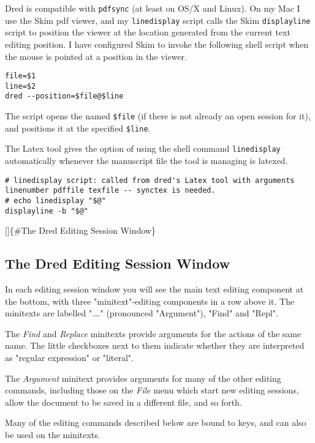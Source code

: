 \documentclass[
]{article}
\begin{document}
Dred is compatible with \texttt{pdfsync} (at least on OS/X and Linux).
On my Mac I use the Skim pdf viewer, and my \texttt{linedisplay} script
calls the Skim \texttt{displayline} script to position the viewer at the
location generated from the current text editing position. I have
configured Skim to invoke the following shell script when the mouse is
pointed at a position in the viewer.

\begin{verbatim}
file=$1
line=$2
dred --position=$file@$line
\end{verbatim}

The script opens the named \texttt{\$file} (if there is not already an
open session for it), and positions it at the specified \texttt{\$line}.

The Latex tool gives the option of using the shell command
\texttt{linedisplay} automatically whenever the manuscript file the tool
is managing is latexed.

\begin{verbatim}
# linedisplay script: called from dred's Latex tool with arguments linenumber pdffile texfile -- synctex is needed.
# echo linedisplay "$@"
displayline -b "$@"
\end{verbatim}

{[}{]}\{\#The Dred Editing Session Window\}

\hypertarget{the-dred-editing-session-window}{%
\subsection{The Dred Editing Session
Window}\label{the-dred-editing-session-window}}

In each editing session window you will see the main text editing
component at the bottom, with three "minitext"-editing components in a
row above it. The minitexts are labelled ".\ldots" (pronounced
"Argument"), "Find" and "Repl".

The \emph{Find} and \emph{Replace} minitexts provide arguments for the
actions of the same name. The little checkboxes next to them indicate
whether they are interpreted as "regular expression" or "literal".

The \emph{Argument} minitext provides arguments for many of the other
editing commands, including those on the \emph{File} menu which start
new editing sessions, allow the document to be saved in a different
file, and so forth.

Many of the editing commands described below are bound to keys, and can
also be used on the minitexts.
\end{document}

